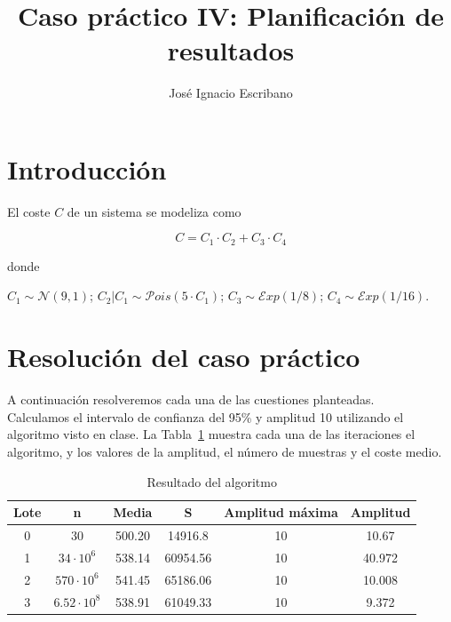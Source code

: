 \documentclass[12pt,a4paper,twoside,openright,titlepage,final]{article}
\author{José Ignacio Escribano}
\title{Caso práctico IV: Planificación de resultados}
\begin{document}
\setcounter{page}{1}


\listoftables
\thispagestyle{empty}
\newpage

\listoffigures
\thispagestyle{empty}
\newpage

\tableofcontents
\thispagestyle{empty}
\newpage


\setcounter{page}{1}

\section{Introducción}

El coste $C$ de un sistema se modeliza como 

\[ C = C_1 \cdot C_2 + C_3 \cdot C_4 \]

donde

$C_1 \sim \mathcal{N}(9, 1)$; $C_2 | C_1 \sim \mathcal{P}ois(5\cdot C_1)$; $C_3 \sim \mathcal{E}xp(1/8)$; $C_4 \sim \mathcal{E}xp(1/16)$.

\section{Resolución del caso práctico}

A continuación resolveremos cada una de las cuestiones planteadas.\\

Calculamos el intervalo de confianza del 95\% y amplitud 10 utilizando el algoritmo visto en clase. La Tabla~\ref{tbl:resultado} muestra cada una de las iteraciones el algoritmo, y los valores de la amplitud, el número de muestras y el coste medio.

\begin{table}[htbp!]
\centering
\caption{Resultado del algoritmo}
\label{tbl:resultado}
\begin{tabular}{@{}cccccc@{}}
\toprule
Lote & n                & Media  & S        & Amplitud máxima & Amplitud \\ \midrule
0    & 30               & 500.20 & 14916.8  & 10              & 10.67    \\
1    & $34\cdot 10^6$   & 538.14 & 60954.56 & 10              & 40.972   \\
2    & $570\cdot 10^6$  & 541.45 & 65186.06 & 10              & 10.008   \\
3    & $6.52\cdot 10^8$ & 538.91 & 61049.33 & 10              & 9.372    \\ \bottomrule
\end{tabular}
\end{table}
\end{document}
